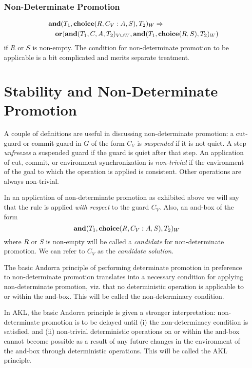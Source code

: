 \subsubsection*{Non-Determinate Promotion}

{\renewcommand{\arraystretch}{1.3}%
\begin{eqnarray*}
\lefteqn{\AND(T_1, \CHOICE(R, C_V \wait A, S), T_2)_W \rewriteto}\\
\mbox{\qquad}& &\OR(\AND(T_1, C, A, T_2)_{V\cup W}, \AND(T_1, \CHOICE(R, S), T_2)_W)
\end{eqnarray*}}%
%
if $R$ or $S$ is non-empty. The condition for non-determinate
promotion to be applicable is a bit complicated and merits separate
treatment.

\section{Stability and Non-Determinate Promotion}\label{REF4}

A couple of definitions are useful in discussing non-determinate
promotion: a cut-guard or commit-guard in $G$ of the form $C_V$ is
{\em suspended} if it is not quiet. A step {\em unfreezes} a suspended
guard if the guard is quiet after that step. An application of cut,
commit, or environment synchronization is {\em non-trivial} if the
environment of the goal to which the operation is applied is
consistent. Other operations are always non-trivial.

In an application of non-determinate promotion as exhibited above we
will say that the rule is applied {\em with respect} to the guard
$C_V$.  Also, an and-box of the form $$\mbox{\bf and}(T_1, \mbox{\bf choice}(R, C_V \mathrel{\mbox{:}}
A, S), T_2)_W$$ where $R$ or $S$ is non-empty will be called a {\em
candidate} for non-determinate promotion.  We can refer to
$C_V$ as the {\em candidate solution}.

The basic Andorra principle of performing determinate promotion in
preference to non-determinate promotion translates into a necessary
condition for applying non-determinate promotion, viz. that no
deterministic operation is applicable to or within the and-box. This
will be called the non-determinacy condition.

In AKL, the basic Andorra principle is given a stronger
interpretation: non-determinate promotion is to be delayed until (i)
the non-determinacy condition is satisfied, and (ii) non-trivial
deterministic operations on or within the and-box cannot become
possible as a result of any future changes in the environment of the
and-box through deterministic operations. This will be called the AKL
principle.

